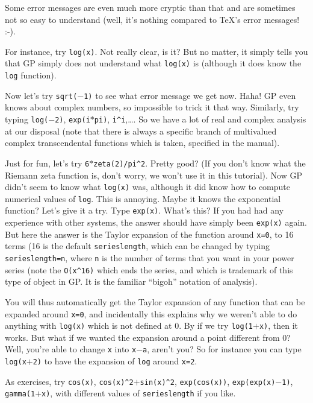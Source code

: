Some error messages are even much more cryptic than that and are sometimes not so
easy to understand (well, it's nothing compared to \TeX's error messages! :-).

For instance, try {\tt log(x)}. Not really clear, is it? But no matter, it simply
tells you that GP simply does not understand what {\tt log(x)} is (although it
does know the {\tt log} function).

Now let's try {\tt sqrt($-$1)} to see what error message we get now. Haha! GP even
knows about complex numbers, so impossible to trick it that way. Similarly, try
typing {\tt log($-$2)}, {\tt exp(i$*$pi)}, {\tt i\^{}i},\dots. So we have a lot of real and complex
analysis at our disposal (note that there is always a specific branch of
multivalued complex transcendental functions which is taken, specified in the manual).

Just for fun, let's try {\tt 6$*$zeta(2)/pi\^{}2}. Pretty good? (If you
don't know what the Riemann zeta function is, don't worry, we won't
use it in this tutorial).
\medskip
Now GP didn't seem to know what {\tt log(x)} was, although it did know how to compute
numerical values of {\tt log}. This is annoying. Maybe it knows the exponential
function? Let's give it a try. Type {\tt exp(x)}. What's this? If you had had any experience
with other systems, the answer should have simply been {\tt exp(x)} again. But here the
answer is the Taylor expansion of the function around {\tt x=0}, to 16 terms (16 is the
default {\tt serieslength}, which can be changed by typing {\tt \bs serieslength=n},
where {\tt n} is the number of terms that you want in your power series (note the {\tt O(x\^{}16)}
which ends the series, and which is trademark of this type of object in GP. It is the familiar
``bigoh'' notation of analysis).

You will thus automatically get the Taylor expansion of any function that can be expanded
around {\tt x=0}, and incidentally this explains
why we weren't able to do anything with {\tt log(x)} which is not defined at 0. By if we try
{\tt log(1$+$x)}, then it works. But what if we wanted the expansion around a point different
from 0? Well, you're able to change {\tt x} into {\tt x$-$a}, aren't you? So for instance
you can type {\tt log(x$+$2)} to have the expansion of {\tt log} around {\tt x=2}. 

As exercises, try {\tt cos(x)}, {\tt cos(x)\^{}2$+$sin(x)\^{}2}, {\tt exp(cos(x))},
{\tt exp(exp(x)$-$1)}, {\tt gamma(1$+$x)}, with different values of {\tt serieslength} if you like.

